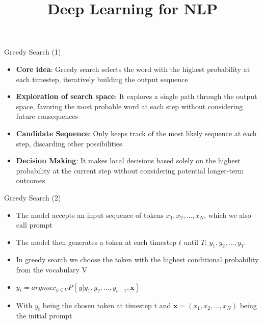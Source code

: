 \documentclass[11pt,compress,t,notes=noshow, xcolor=table]{beamer}
\title{Deep Learning for NLP}
\begin{document}


\begin{frame}{Greedy Search (1)}

\vfill

\begin{itemize}
    \item \textbf{Core idea}: Greedy search selects the word with the highest probability at each timestep, iteratively building the output sequence
    \item \textbf{Exploration of search space}: It explores a single path through the output space, favoring the most probable word at each step without considering future consequences
    \item \textbf{Candidate Sequence}: Only keeps track of the most likely sequence at each step, discarding other possibilities
    \item \textbf{Decision Making}: It makes local decisions based solely on the highest probability at the current step without considering potential longer-term outcomes
\end{itemize}

\vfill
    
\end{frame}


\begin{frame}{Greedy Search (2)}

\vfill

\begin{itemize}
    \item The model accepts an input sequence of tokens $x_1, x_2,...,x_N$, which we also call prompt
    \item The model then generates a token at each timestep $t$ until $T$: $y_1,y_2,...,y_T$
    \item In greedy search we choose the token with the highest conditional probability from the vocabulary V
    \item $y_t = argmax_{y \in V}P(y|y_1,y_2,...,y_{t-1},\mathbf{x})$
    \item With $y_t$ being the chosen token at timestep t and $\mathbf{x} = (x_1, x_2,...,x_N)$ being the initial prompt
\end{itemize}

\vfill

\end{frame}
\end{document}
